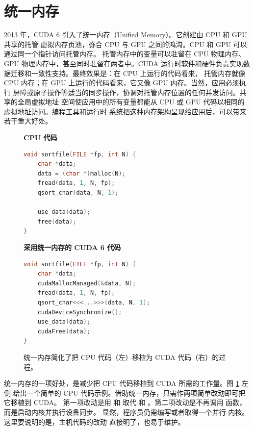 \section{统一内存}
\label{sec:appc-unified-memory}

2013 年，CUDA 6 引入了统一内存（Unified Memory）。它创建由 CPU 和 GPU 共享的托管
虚拟内存页池，弥合 CPU 与 GPU 之间的鸿沟。CPU 和 GPU 可以通过同一个指针访问托管内存。
托管内存中的变量可以驻留在 CPU 物理内存、GPU 物理内存中，甚至同时驻留在两者中。CUDA
运行时软件和硬件负责实现数据迁移和一致性支持。最终效果是：在 CPU 上运行的代码看来，
托管内存就像 CPU 内存；在 GPU 上运行的代码看来，它又像 GPU 内存。当然，应用必须执行
屏障或原子操作等适当的同步操作，协调对托管内存位置的任何并发访问。共享的全局虚拟地址
空间使应用中的所有变量都能从 CPU 或 GPU 代码以相同的虚拟地址访问。编程工具和运行时
系统把这种内存架构呈现给应用后，可以带来若干重大好处。

\begin{figure}[htbp]
  \centering
  \begin{minipage}[t]{0.47\textwidth}
    \centering\textbf{CPU 代码}
\begin{lstlisting}[language=C++,basicstyle=\ttfamily\scriptsize]
void sortfile(FILE *fp, int N) {
    char *data;
    data = (char *)malloc(N);
    fread(data, 1, N, fp);
    qsort_char(data, N, 1);

    use_data(data);
    free(data);
}
\end{lstlisting}
  \end{minipage}\hfill
  \begin{minipage}[t]{0.49\textwidth}
    \centering\textbf{采用统一内存的 CUDA 6 代码}
\begin{lstlisting}[language=C++,basicstyle=\ttfamily\scriptsize]
void sortfile(FILE *fp, int N) {
    char *data;
    cudaMallocManaged(&data, N);
    fread(data, 1, N, fp);
    qsort_char<<<...>>>(data, N, 1);
    cudaDeviceSynchronize();
    use_data(data);
    cudaFree(data);
}
\end{lstlisting}
  \end{minipage}
  \caption{统一内存简化了把 CPU 代码（左）移植为 CUDA 代码（右）的过程。}
  \label{fig:c-1}
\end{figure}

统一内存的一项好处，是减少把 CPU 代码移植到 CUDA 所需的工作量。图 \ref{fig:c-1} 左侧
给出一个简单的 CPU 代码示例。借助统一内存，只需作两项简单改动即可把它移植到 CUDA。
第一项改动是用  和  取代  和
。第二项改动是不再调用  函数，而是启动内核并执行设备同步。
显然，程序员仍需编写或者取得一个并行  内核。这里要说明的是，主机代码的改动
直接明了，也易于维护。

